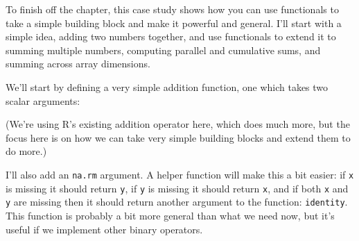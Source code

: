 To finish off the chapter, this case study shows how you can use
functionals to take a simple building block and make it powerful and
general. I'll start with a simple idea, adding two numbers together, and
use functionals to extend it to summing multiple numbers, computing
parallel and cumulative sums, and summing across array dimensions.

We'll start by defining a very simple addition function, one which takes
two scalar arguments:

\begin{Shaded}
\begin{Highlighting}[]
\StringTok{ }
  \NormalTok{(}\OperatorTok{==}\StringTok{ }\NormalTok{, }\OperatorTok{==}\StringTok{ }\NormalTok{,}
\OperatorTok{+}\StringTok{ }
\NormalTok{\}}
\end{Highlighting}
\end{Shaded}

(We're using R's existing addition operator here, which does much more,
but the focus here is on how we can take very simple building blocks and
extend them to do more.)

I'll also add an \texttt{na.rm} argument. A helper function will make
this a bit easier: if \texttt{x} is missing it should return \texttt{y},
if \texttt{y} is missing it should return \texttt{x}, and if both
\texttt{x} and \texttt{y} are missing then it should return another
argument to the function: \texttt{identity}. This function is probably a
bit more general than what we need now, but it's useful if we implement
other binary operators.

\begin{Shaded}
\begin{Highlighting}[]
\StringTok{ }
  \NormalTok{ (}\OperatorTok{&&}\StringTok{ }
\NormalTok{  \} } \NormalTok{ (}
\NormalTok{  \} }\NormalTok{ \{}
\NormalTok{  \}}
\NormalTok{\}}
\NormalTok{(}\NormalTok{, }\NormalTok{, }\NormalTok{)}
\end{Highlighting}
\end{Shaded}

